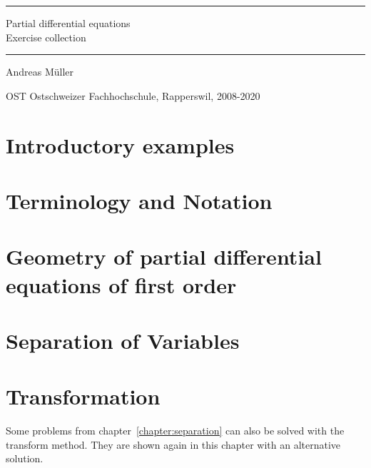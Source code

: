 \documentclass[a4paper,12pt]{book}
\begin{document}
\pagestyle{fancy}
\rhead{}
\frontmatter
\newcommand\HRule{\noindent\rule{\linewidth}{1.5pt}}
\begin{titlepage}
\HRule
\vspace*{2pt}
\begin{flushright}
{\Huge
Partial differential equations\\
\bigskip
Exercise collection}
\end{flushright}
\HRule
\begin{flushright}
\vspace{30pt}
\LARGE
Andreas Müller
\end{flushright}
\begin{center}
OST Ostschweizer Fachhochschule, Rapperswil, 2008-2020
\end{center}
\end{titlepage}
\hypersetup{
	colorlinks=true,
	linktoc=all,
	linkcolor=blue
}
\tableofcontents
\newenvironment{beispiel}[1][Example]{%
\begin{proof}[#1]%
\renewcommand{\qedsymbol}{$\bigcirc$}
}{\end{proof}}
\mainmatter


\chapter{Introductory examples}

\chapter{Terminology and Notation}

\chapter{Geometry of partial differential equations of first order
\label{chapter:separation}}

\chapter{Separation of Variables\label{chapter:separation}}

\chapter{Transformation}
Some problems from chapter~\ref{chapter:separation}
can also be solved with the transform method.
They are shown again in this chapter with an alternative solution.
\bigskip
\end{document}
